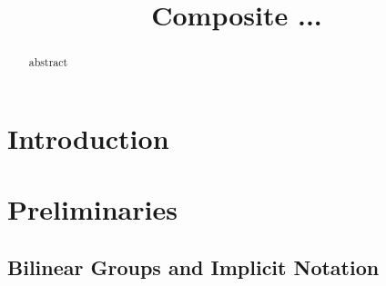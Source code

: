 \documentclass{llncs}
\title{Composite ...}
\begin{document}
\maketitle
\begin{abstract} 
 abstract
  \end{abstract} 



\section{Introduction}

%

\section{Preliminaries}\label{sec:prelims}



\subsection{Bilinear Groups and Implicit Notation}


%

%
%

%


%

%

%
%
%





%
\end{document}

